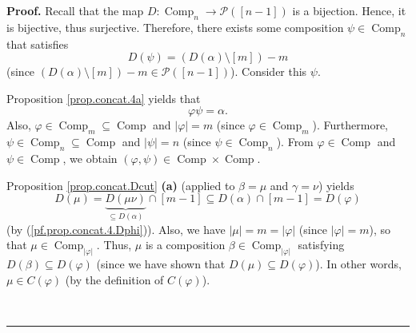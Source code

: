 \documentclass[numbers=enddot,12pt,final,onecolumn,notitlepage]{scrartcl}%
\theoremstyle{definition}
\newenvironment{proof}[1][Proof]{\noindent\textbf{#1.} }{\ \rule{0.5em}{0.5em}}
\begin{document}
\begin{proof}
Recall that the map $D:\operatorname*{Comp}\nolimits_{n}\rightarrow
\mathcal{P}\left(  \left[  n-1\right]  \right)  $ is a bijection. Hence, it is
bijective, thus surjective. Therefore, there exists some composition $\psi
\in\operatorname*{Comp}\nolimits_{n}$ that satisfies%
\begin{equation}
D\left(  \psi\right)  =\left(  D\left(  \alpha\right)  \setminus\left[
m\right]  \right)  -m \label{pf.prop.concat.4.Dpsi}%
\end{equation}
(since $\left(  D\left(  \alpha\right)  \setminus\left[  m\right]  \right)
-m\in\mathcal{P}\left(  \left[  n-1\right]  \right)  $). Consider this $\psi$.

Proposition \ref{prop.concat.4a} yields that
\[
\varphi\psi=\alpha.
\]
Also, $\varphi\in\operatorname*{Comp}\nolimits_{m}\subseteq
\operatorname*{Comp}$ and $\left\vert \varphi\right\vert =m$ (since
$\varphi\in\operatorname*{Comp}\nolimits_{m}$). Furthermore, $\psi
\in\operatorname*{Comp}\nolimits_{n}\subseteq\operatorname*{Comp}$ and
$\left\vert \psi\right\vert =n$ (since $\psi\in\operatorname*{Comp}%
\nolimits_{n}$). From $\varphi\in\operatorname*{Comp}$ and $\psi
\in\operatorname*{Comp}$, we obtain $\left(  \varphi,\psi\right)
\in\operatorname*{Comp}\times\operatorname*{Comp}$.

Proposition \ref{prop.concat.Dcut} \textbf{(a)} (applied to $\beta=\mu$ and
$\gamma=\nu$) yields%
\[
D\left(  \mu\right)  =\underbrace{D\left(  \mu\nu\right)  }_{\subseteq
D\left(  \alpha\right)  }\cap\left[  m-1\right]  \subseteq D\left(
\alpha\right)  \cap\left[  m-1\right]  =D\left(  \varphi\right)
\]
(by (\ref{pf.prop.concat.4.Dphi})). Also, we have $\left\vert \mu\right\vert
=m=\left\vert \varphi\right\vert $ (since $\left\vert \varphi\right\vert =m$),
so that $\mu\in\operatorname*{Comp}\nolimits_{\left\vert \varphi\right\vert }%
$. Thus, $\mu$ is a composition $\beta\in\operatorname*{Comp}%
\nolimits_{\left\vert \varphi\right\vert }$ satisfying $D\left(  \beta\right)
\subseteq D\left(  \varphi\right)  $ (since we have shown that $D\left(
\mu\right)  \subseteq D\left(  \varphi\right)  $). In other words, $\mu\in
C\left(  \varphi\right)  $ (by the definition of $C\left(  \varphi\right)  $).


\end{proof}
\end{document}
